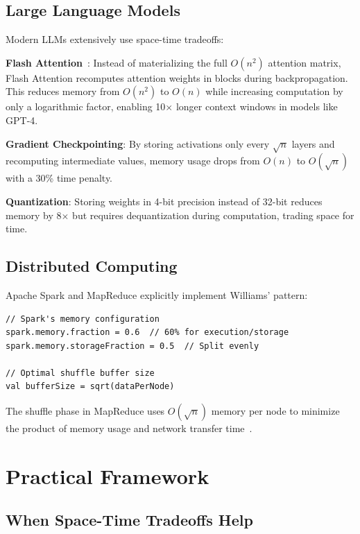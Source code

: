 \documentclass[11pt]{article}
\theoremstyle{definition}
\begin{document}
\subsection{Large Language Models}

Modern LLMs extensively use space-time tradeoffs:

\textbf{Flash Attention}~\cite{flashattention2022}: Instead of materializing the full $O(n^2)$ attention matrix, Flash Attention recomputes attention weights in blocks during backpropagation. This reduces memory from $O(n^2)$ to $O(n)$ while increasing computation by only a logarithmic factor, enabling 10$\times$ longer context windows in models like GPT-4.

\textbf{Gradient Checkpointing}: By storing activations only every $\sqrt{n}$ layers and recomputing intermediate values, memory usage drops from $O(n)$ to $O(\sqrt{n})$ with a 30\% time penalty.

\textbf{Quantization}: Storing weights in 4-bit precision instead of 32-bit reduces memory by 8$\times$ but requires dequantization during computation, trading space for time.

\subsection{Distributed Computing}

Apache Spark and MapReduce explicitly implement Williams' pattern:

\begin{verbatim}
// Spark's memory configuration
spark.memory.fraction = 0.6  // 60% for execution/storage
spark.memory.storageFraction = 0.5  // Split evenly

// Optimal shuffle buffer size
val bufferSize = sqrt(dataPerNode)
\end{verbatim}

The shuffle phase in MapReduce uses $O(\sqrt{n})$ memory per node to minimize the product of memory usage and network transfer time~\cite{dean2008mapreduce}.

\section{Practical Framework}
\label{sec:framework}

\subsection{When Space-Time Tradeoffs Help}
\end{document}
